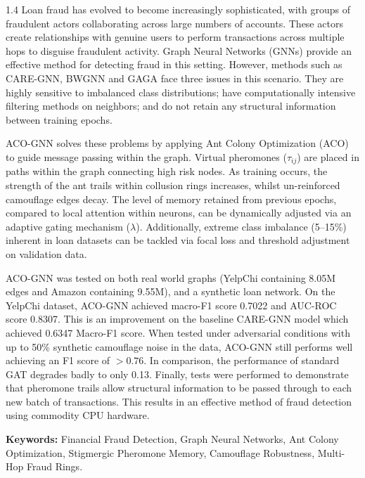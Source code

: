 \begin{spacing}{1.4}
\noindent Loan fraud has evolved to become increasingly sophisticated, with groups of fraudulent actors collaborating across large numbers of accounts. These actors create relationships with genuine users to perform transactions across multiple hops to disguise fraudulent activity. Graph Neural Networks (GNNs) provide an effective method for detecting fraud in this setting. However, methods such as CARE-GNN, BWGNN and GAGA face three issues in this scenario. They are highly sensitive to imbalanced class distributions; have computationally intensive filtering methods on neighbors; and do not retain any structural information between training epochs.\par

\noindent ACO-GNN solves these problems by applying Ant Colony Optimization (ACO) to guide message passing within the graph. Virtual pheromones ($\tau_{ij}$) are placed in paths within the graph connecting high risk nodes. As training occurs, the strength of the ant trails within collusion rings increases, whilst un-reinforced camouflage edges decay. The level of memory retained from previous epochs, compared to local attention within neurons, can be dynamically adjusted via an adaptive gating mechanism ($\lambda$). Additionally, extreme class imbalance (5--15\%) inherent in loan datasets can be tackled via focal loss and threshold adjustment on validation data.\par

\noindent ACO-GNN was tested on both real world graphs (YelpChi containing 8.05M edges and Amazon containing 9.55M), and a synthetic loan network. On the YelpChi dataset, ACO-GNN achieved macro-F1 score 0.7022 and AUC-ROC score 0.8307. This is an improvement on the baseline CARE-GNN model which achieved 0.6347 Macro-F1 score. When tested under adversarial conditions with up to 50\% synthetic camouflage noise in the data, ACO-GNN still performs well achieving an F1 score of $> 0.76$. In comparison, the performance of standard GAT degrades badly to only 0.13. Finally, tests were performed to demonstrate that pheromone trails allow structural information to be passed through to each new batch of transactions. This results in an effective method of fraud detection using commodity CPU hardware.\par
\end{spacing}

\vfill
\noindent\textbf{Keywords:} Financial Fraud Detection, Graph Neural Networks, Ant Colony Optimization, Stigmergic Pheromone Memory, Camouflage Robustness, Multi-Hop Fraud Rings.
